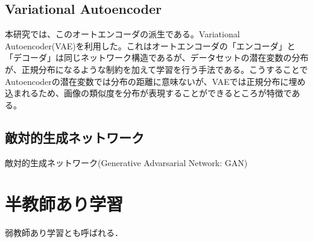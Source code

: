 \subsection{Variational Autoencoder}
本研究では、このオートエンコーダの派生である。Variational Autoencoder(VAE)を利用した。これはオートエンコーダの「エンコーダ」と「デコーダ」は同じネットワーク構造であるが、データセットの潜在変数の分布が、正規分布になるような制約を加えて学習を行う手法である。こうすることでAutoencoderの潜在変数では分布の距離に意味ないが、VAEでは正規分布に埋め込まれるため、画像の類似度を分布が表現することができるところが特徴である。

\subsection{敵対的生成ネットワーク}
敵対的生成ネットワーク(Generative Advarsarial Network: GAN)

\section{半教師あり学習}
弱教師あり学習とも呼ばれる．
